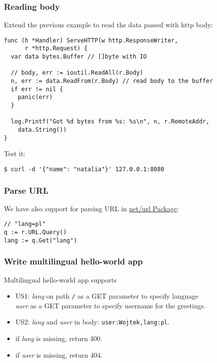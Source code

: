 \documentclass[11pt, letterpaper]{article}
\begin{document}
\subsubsection{Reading body}

Extend the previous example to read the data passed with http body:

\begin{verbatim}
func (h *Handler) ServeHTTP(w http.ResponseWriter,
      r *http.Request) {
  var data bytes.Buffer // []byte with IO
  
  // body, err := ioutil.ReadAll(r.Body)
  n, err := data.ReadFrom(r.Body) // read body to the buffer
  if err != nil {  
    panic(err) 
  }

  log.Printf("Got %d bytes from %s: %s\n", n, r.RemoteAddr,
    data.String())
}
\end{verbatim}

Test it:

\begin{verbatim}
$ curl -d '{"name": "natalia"}' 127.0.0.1:8080 
\end{verbatim}


\subsubsection{Parse URL}

We have also support for parsing URL in \href{https://golang.org/pkg/net/url/}{net/url Package}:

\begin{verbatim}
// "lang=pl"
q := r.URL.Query()
lang := q.Get("lang")
\end{verbatim}

\subsubsection{Write multilingual hello-world app}

Multilingual hello-world app supports 

\begin{itemize}
\item US1: \emph{lang} on path \verb|/| as a GET parameter to specify language \\
       \emph{user} as a GET parameter to specify username for the greetings.
\item US2: \emph{lang} and  \emph{user} in body: \verb|user:Wojtek,lang:pl|.
\item if \emph{lang} is missing, return 400.
\item if \emph{user} is missing, return 404.
\end{itemize}
\end{document}
